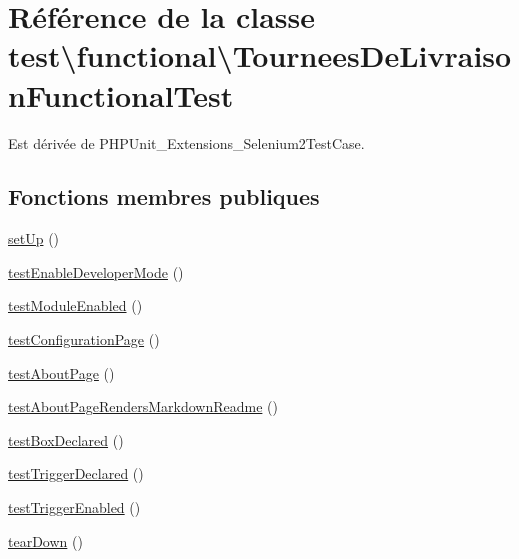 \hypertarget{classtest_1_1functional_1_1TourneesDeLivraisonFunctionalTest}{}\section{Référence de la classe test\textbackslash{}functional\textbackslash{}Tournees\+De\+Livraison\+Functional\+Test}
\label{classtest_1_1functional_1_1TourneesDeLivraisonFunctionalTest}


Est dérivée de P\+H\+P\+Unit\+\_\+\+Extensions\+\_\+\+Selenium2\+Test\+Case.

\subsection*{Fonctions membres publiques}
\begin{DoxyCompactItemize}
\item 
\hyperlink{classtest_1_1functional_1_1TourneesDeLivraisonFunctionalTest_aa8799a858c55a60890c8024f2b11d978}{set\+Up} ()
\item 
\hyperlink{classtest_1_1functional_1_1TourneesDeLivraisonFunctionalTest_ae71eabd8427e6eb5974f3155200da399}{test\+Enable\+Developer\+Mode} ()
\item 
\hyperlink{classtest_1_1functional_1_1TourneesDeLivraisonFunctionalTest_a217aa5c28c6e6cdd76ed0297115963fe}{test\+Module\+Enabled} ()
\item 
\hyperlink{classtest_1_1functional_1_1TourneesDeLivraisonFunctionalTest_a60d83645af26d139dc89db6e5fa17103}{test\+Configuration\+Page} ()
\item 
\hyperlink{classtest_1_1functional_1_1TourneesDeLivraisonFunctionalTest_a3dc1deccd6e5b07f3e7f91301219de24}{test\+About\+Page} ()
\item 
\hyperlink{classtest_1_1functional_1_1TourneesDeLivraisonFunctionalTest_a8ba5e051059e30bc6cfe4b1f28331ce9}{test\+About\+Page\+Renders\+Markdown\+Readme} ()
\item 
\hyperlink{classtest_1_1functional_1_1TourneesDeLivraisonFunctionalTest_aab77b4094bd53868121657ad527df572}{test\+Box\+Declared} ()
\item 
\hyperlink{classtest_1_1functional_1_1TourneesDeLivraisonFunctionalTest_a0ee72021f3688c9f247b28be5f552142}{test\+Trigger\+Declared} ()
\item 
\hyperlink{classtest_1_1functional_1_1TourneesDeLivraisonFunctionalTest_a0944c91d41d478e30b43f44ceaf5ae5b}{test\+Trigger\+Enabled} ()
\item 
\hyperlink{classtest_1_1functional_1_1TourneesDeLivraisonFunctionalTest_ab6c4fe3817da852447adbca9faabba06}{tear\+Down} ()
\end{DoxyCompactItemize}
